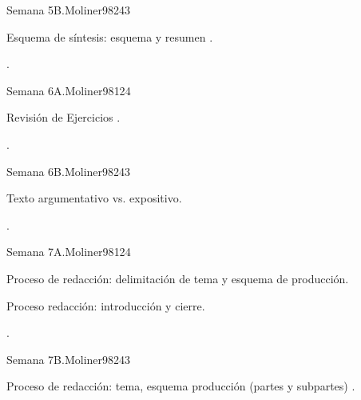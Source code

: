 \begin{syllabus}
\begin{unit}{}{Semana 5B.}{Moliner98}{24}{3}
   \begin{topics}
      \item Esquema de síntesis: esquema y resumen .
   \end{topics}

   \begin{learningoutcomes}
      \item .
      \end{learningoutcomes}
\end{unit}

\begin{unit}{}{Semana 6A.}{Moliner98}{12}{4}
   \begin{topics}
      \item Revisión de Ejercicios .
   \end{topics}
   \begin{learningoutcomes}
      \item .
   \end{learningoutcomes}
\end{unit}

\begin{unit}{}{Semana 6B.}{Moliner98}{24}{3}
   \begin{topics}
      \item Texto argumentativo vs. expositivo.
   \end{topics}

   \begin{learningoutcomes}
      \item . 
      \end{learningoutcomes}
\end{unit}

\begin{unit}{}{Semana 7A.}{Moliner98}{12}{4}
   \begin{topics}
      \item Proceso de redacción: delimitación de tema y esquema de producción.
      \item Proceso redacción: introducción y cierre.
   \end{topics}
   \begin{learningoutcomes}
      \item .
   \end{learningoutcomes}
\end{unit}

\begin{unit}{}{Semana 7B.}{Moliner98}{24}{3}
   \begin{topics}
      \item Proceso de redacción: tema, esquema producción (partes y subpartes) . 
   \end{topics}


\end{unit}
\end{syllabus}
